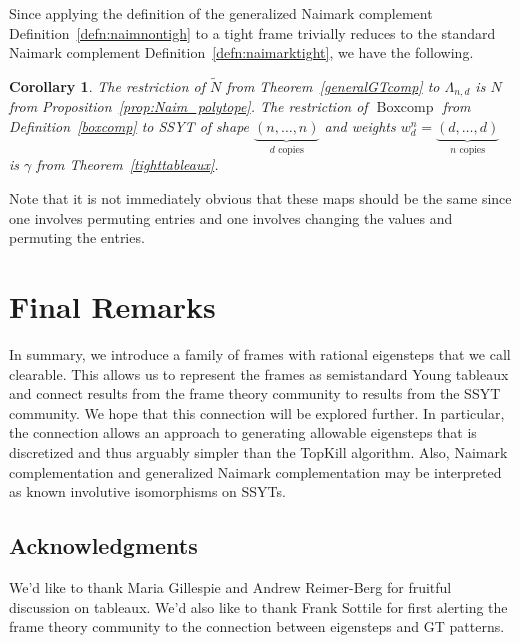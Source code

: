 \documentclass[10pt]{article}
\theoremstyle{plain}
\newtheorem{cor}[thm]{Corollary}
\theoremstyle{definition}
\newcommand{\bc}{\operatorname{Boxcomp}}
\begin{document}
Since applying the definition of the generalized Naimark complement Definition~\ref{defn:naimnontigh} to a tight frame trivially reduces to the standard Naimark complement Definition~\ref{defn:naimarktight}, we have the following.
\begin{cor}
The restriction of $\tilde{N}$ from Theorem~\ref{generalGTcomp} to $\Lambda_{n,d}$ is $N$ from Proposition~\ref{prop:Naim_polytope}.  The restriction of $\bc$ from Definition~\ref{boxcomp} to SSYT of shape $\underbrace{(n, \dots, n)}_{d \text{ copies}}$ and weights $w_d^n =\underbrace{(d, \dots, d)}_{n \text{ copies}}$ is $\gamma$ from Theorem~\ref{tighttableaux}.
\end{cor}
Note that it is not immediately obvious that these maps should be the same since one involves permuting entries and one involves changing the values and permuting the entries.

\section{Final Remarks}
In summary, we introduce a family of frames with rational eigensteps that we call clearable.  This allows us to represent the frames as semistandard Young tableaux and connect results from the frame theory community to results from the SSYT community.  We hope that this connection will be explored further.  In particular, the connection allows an approach to generating allowable eigensteps that is discretized and thus arguably simpler than the TopKill algorithm.  Also, Naimark complementation and generalized Naimark complementation may be interpreted as known involutive isomorphisms on SSYTs.

\subsection{Acknowledgments} We'd like to thank Maria Gillespie and Andrew Reimer-Berg for fruitful discussion on tableaux.  We'd also like to thank Frank Sottile for first alerting the frame theory community to the connection between eigensteps and GT patterns.
\printbibliography
\end{document}
